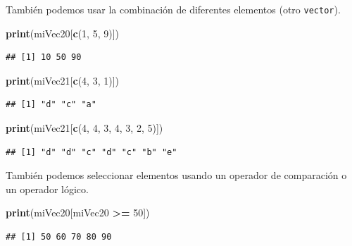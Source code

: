 \documentclass[
]{book}
\newenvironment{Shaded}{\begin{snugshade}}{\end{snugshade}}
\newcommand{\DecValTok}[1]{\textcolor[rgb]{0.00,0.00,0.81}{#1}}
\newcommand{\KeywordTok}[1]{\textcolor[rgb]{0.13,0.29,0.53}{\textbf{#1}}}
\newcommand{\NormalTok}[1]{#1}
\newcommand{\OperatorTok}[1]{\textcolor[rgb]{0.81,0.36,0.00}{\textbf{#1}}}
\newcommand{\StringTok}[1]{\textcolor[rgb]{0.31,0.60,0.02}{#1}}
\begin{document}
También podemos usar la combinación de diferentes elementos (otro \texttt{vector}).

\begin{Shaded}
\begin{Highlighting}[]
\KeywordTok{print}\NormalTok{(miVec20[}\KeywordTok{c}\NormalTok{(}\DecValTok{1}\NormalTok{, }\DecValTok{5}\NormalTok{, }\DecValTok{9}\NormalTok{)])}
\end{Highlighting}
\end{Shaded}

\begin{verbatim}
## [1] 10 50 90
\end{verbatim}

\begin{Shaded}
\begin{Highlighting}[]
\KeywordTok{print}\NormalTok{(miVec21[}\KeywordTok{c}\NormalTok{(}\DecValTok{4}\NormalTok{, }\DecValTok{3}\NormalTok{, }\DecValTok{1}\NormalTok{)])}
\end{Highlighting}
\end{Shaded}

\begin{verbatim}
## [1] "d" "c" "a"
\end{verbatim}

\begin{Shaded}
\begin{Highlighting}[]
\KeywordTok{print}\NormalTok{(miVec21[}\KeywordTok{c}\NormalTok{(}\DecValTok{4}\NormalTok{, }\DecValTok{4}\NormalTok{, }\DecValTok{3}\NormalTok{, }\DecValTok{4}\NormalTok{, }\DecValTok{3}\NormalTok{, }\DecValTok{2}\NormalTok{, }\DecValTok{5}\NormalTok{)])}
\end{Highlighting}
\end{Shaded}

\begin{verbatim}
## [1] "d" "d" "c" "d" "c" "b" "e"
\end{verbatim}

También podemos seleccionar elementos usando un operador de comparación o un operador lógico.

\begin{Shaded}
\begin{Highlighting}[]
\KeywordTok{print}\NormalTok{(miVec20[miVec20 }\OperatorTok{>=}\StringTok{ }\DecValTok{50}\NormalTok{])}
\end{Highlighting}
\end{Shaded}

\begin{verbatim}
## [1] 50 60 70 80 90
\end{verbatim}
\end{document}
